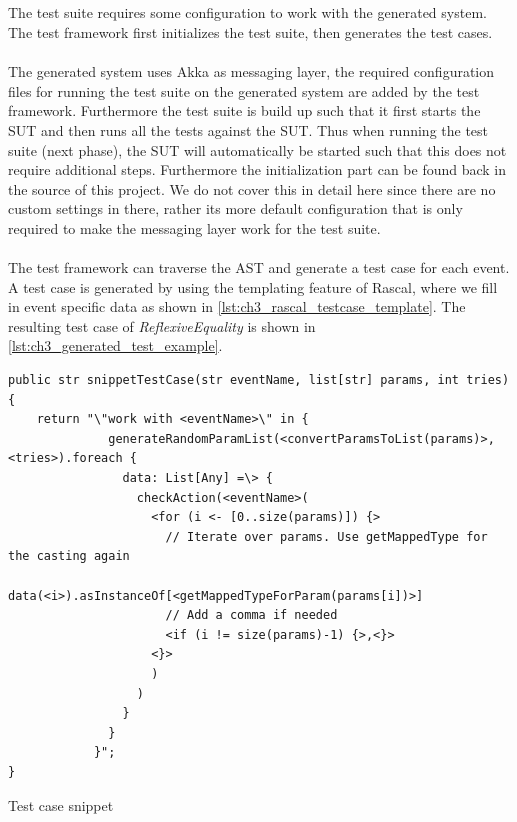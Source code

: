 \subsection{\tfPhaseFour{}}
\label{sct:3_tf_phase_four}
The test suite requires some configuration to work with the generated system. The test framework first initializes the test suite, then generates the test cases.\\
\\
The generated system uses Akka as messaging layer, the required configuration files for running the test suite on the generated system are added by the test framework. Furthermore the test suite is build up such that it first starts the SUT and then runs all the tests against the SUT. Thus when running the test suite (next phase), the SUT will automatically be started such that this does not require additional steps. Furthermore the initialization part can be found back in the source of this project. We do not cover this in detail here since there are no custom settings in there, rather its more default configuration that is only required to make the messaging layer work for the test suite.\\
\\
The test framework can traverse the AST and generate a test case for each event. A test case is generated by using the templating feature of Rascal, where we fill in event specific data as shown in \autoref{lst:ch3_rascal_testcase_template}. The resulting test case of \textit{ReflexiveEquality} is shown in \autoref{lst:ch3_generated_test_example}.
\FloatBarrier
\begin{sourcecode}[!ht]
\begin{lstlisting}[language=Rascal]
public str snippetTestCase(str eventName, list[str] params, int tries) {
	return "\"work with <eventName>\" in {
	          generateRandomParamList(<convertParamsToList(params)>, <tries>).foreach {
	            data: List[Any] =\> {
	              checkAction(<eventName>(
	       	        <for (i <- [0..size(params)]) {>
                      // Iterate over params. Use getMappedType for the casting again
                      data(<i>).asInstanceOf[<getMappedTypeForParam(params[i])>]
                      // Add a comma if needed
                      <if (i != size(params)-1) {>,<}>
                    <}>
	                )
	              )
	            }
	          }
	        }";
}
\end{lstlisting}
\caption{Test case snippet}
\label{lst:ch3_rascal_testcase_template}
\end{sourcecode}
\FloatBarrier

